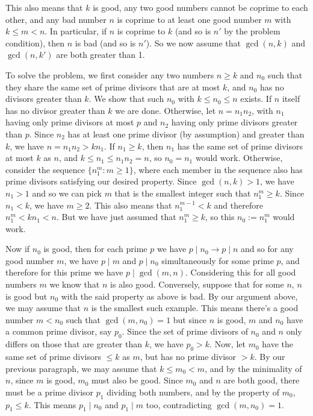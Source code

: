 \documentclass[11pt,a4paper]{article}
\begin{document}
\begin{enumerate}
\begin{itemize}
		\end{itemize}
		This also means that $k$ is good, any two good numbers cannot be coprime to each other, and any bad number $n$ is coprime to at least one good number $m$ with $k\le m<n$. 
		In particular, if $n$ is coprime to $k$ (and so is $n'$ by the problem condition), then $n$ is bad (and so is $n'$). So we now assume that $\gcd(n, k)$ and $\gcd(n, k')$ are both greater than 1. 
		
		To solve the problem, we first consider any two numbers $n\ge k$ and $n_0$ such that they share the same set of prime divisors that are at most $k$, and $n_0$ has no divisors greater than $k$. We show that such $n_0$ with $k\le n_0\le n$ exists. 
		If $n$ itself has no divisor greater than $k$ we are done. 
		Otherwise, let $n=n_1n_2$, with $n_1$ having only prime divisors at most $p$ and $n_2$ having only prime divisors greater than $p$. Since $n_2$ has at least one prime divisor (by assumption) and greater than $k$, we have $n=n_1n_2>kn_1$. If $n_1\ge k$, then $n_1$ has the same set of prime divisors at most $k$ as $n$, and $k\le n_1\le n_1n_2=n$, so $n_0=n_1$ would work. 
		Otherwise, consider the sequence $\{n_1^m: m\ge 1\}$, where each member in the sequence also has prime divisors satisfying our desired property. 
		Since $\gcd(n, k)>1$, we have $n_1>1$ and so we can pick $m$ that is the smallest integer such that $n_1^m\ge k$. Since $n_1<k$, we have $m\ge 2$. This also means that $n_1^{m-1}<k$ and therefore $n_1^m<kn_1<n$. But we have just assumed that $n_1^m\ge k$, so this $n_0:=n_1^m$ would work. 
		
		Now if $n_0$ is good, then for each prime $p$ we have $p\mid n_0\to p\mid n$ and so for any good number $m$, we have $p\mid m$ and $p\mid n_0$ simultaneously for some prime $p$, and therefore for this prime we have $p\mid\gcd(m, n)$. Considering this for all good numbers $m$ we know that $n$ is also good. 
		Conversely, suppose that for some $n$, $n$ is good but $n_0$ with the said property as above is bad. By our argument above, we may assume that $n$ is the smallest such example. This means there's a good number $m<n_0$ such that $\gcd(m, n_0)=1$ but since $n$ is good, $m$ and $n_0$ have a common prime divisor, say $p_0$. 
		Since the set of prime divisors of $n_0$ and $n$ only differs on those that are greater than $k$, 
		we have $p_0>k$. 
		Now, let $m_0$ have the same set of prime divisors $\le k$ as $m$, but has no prime divisor $>k$. 
		By our previous paragraph, we may assume that $k\le m_0<m$, and by the minimality of $n$, since $m$ is good, $m_0$ must also be good. 
		Since $m_0$ and $n$ are both good, there must be a prime divisor $p_1$ dividing both numbers, and by the property of $m_0$, $p_1\le k$. This means $p_1\mid n_0$ and $p_1\mid m$ too, contradicting $\gcd(m, n_0)=1$. 
		

\end{enumerate}
\end{document}
